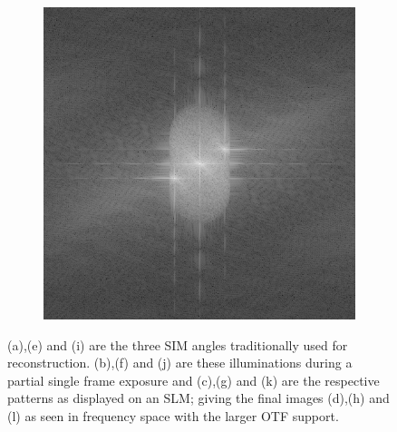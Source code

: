 \begin{figure}[h]
\begin{subfigure}[t]{0.23\textwidth}
        \caption{}
    \end{subfigure}\hfill
    \begin{subfigure}[t]{0.23\textwidth}
        \centering
        \includegraphics[width=\textwidth]{sim_slit/3/fft}
        \caption{}
    \end{subfigure}
  \caption{
  (a),(e) and (i) are the three \gls{SIM} angles traditionally used for reconstruction.
  (b),(f) and (j) are these illuminations during a partial single frame exposure and
  (c),(g) and (k) are the respective patterns as displayed on an \gls{SLM};
  giving the final images (d),(h) and (l) as seen in frequency space with the larger \gls{OTF} support.
  }\label{fig:sim_slit}
\end{figure}
